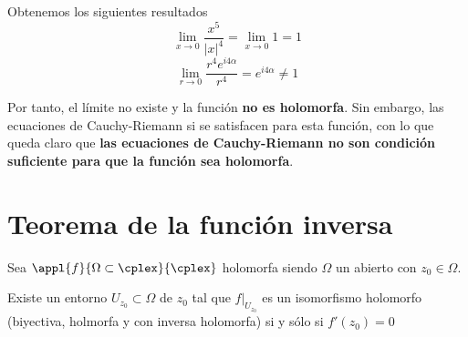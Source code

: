 \documentclass{apuntes}
\begin{document}
\begin{example}
\begin{enumerate}
Obtenemos los siguientes resultados
\[\lim_{x \to 0} \frac{x^5}{|x|^4} = \lim_{x \to 0} 1 = 1\]
\[\lim_{r \to 0} \frac{r^4 e^{i4α}}{r^4} = e^{i4α} \neq 1\]

Por tanto, el límite no existe y la función \textbf{no es holomorfa}. Sin embargo, las ecuaciones de Cauchy-Riemann si se satisfacen para esta función, con lo que queda claro que \textbf{las ecuaciones de Cauchy-Riemann no son condición suficiente para que la función sea holomorfa}.
\end{enumerate}
\end{example}

\section{Teorema de la función inversa}
\begin{theorem}
Sea $\appl{f}{\Omega\subset \cplex}{\cplex}$ holomorfa siendo $\Omega$ un abierto con $z_0\in \Omega$.

Existe un entorno $U_{z_0}\subset \Omega$ de $z_0$ tal que $f|_{U_{z_0}}$ es un isomorfismo holomorfo (biyectiva, holmorfa y con inversa holomorfa) si y sólo si $f'(z_0)=0$
\end{theorem}
\end{document}
